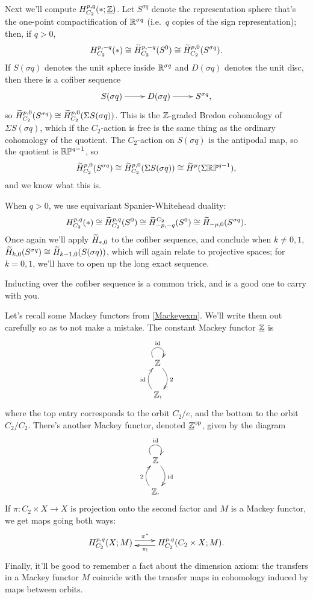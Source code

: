 Next we'll compute $H_{C_2}^{p,q}(*;\underline{\mathbb Z})$. Let $S^{\sigma q}$ denote the representation sphere that's the
one-point compactification of $\mathbb R^{\sigma q}$ (i.e.\ $q$ copies of the sign representation); then, if $q >
0$,
\[H_{C_2}^{p,-q}(*)\cong \widetilde H_{C_2}^{p,-q}(S^0)\cong \widetilde H_{C_2}^{p,0}(S^{\sigma q}).\]
If $S(\sigma q)$ denotes the unit sphere inside $\mathbb R^{\sigma q}$ and $D(\sigma q)$ denotes the unit disc, then there
is a cofiber sequence
\begin{equation}
\label{signed_cofiber}
\xymatrix{
	S(\sigma q)\ar[r] & D(\sigma q)\ar[r] & S^{\sigma q},
}
\end{equation}
so $\widetilde H_{C_2}^{p,0}(S^{\sigma q})\cong\widetilde H_{C_2}^{p,0}(\Sigma S(\sigma q))$. This is the $\mathbb Z$-graded Bredon
cohomology of $\Sigma S(\sigma q)$, which if the $C_2$-action is free is the same thing as the ordinary cohomology
of the quotient. The $C_2$-action on $S(\sigma q)$ is the antipodal map, so the quotient is $\mathbb{RP}^{q-1}$, so
\[\widetilde H_{C_2}^{p,0}(S^{\sigma q})\cong \widetilde H_{C_2}^{p,0}(\Sigma S(\sigma q))\cong \widetilde H^p(\Sigma\mathbb{RP}^{q-1}),\]
and we know what this is.

When $q > 0$, we use equivariant Spanier-Whitehead duality:
\[H_{C_2}^{p,q}(*)\cong \widetilde H_{C_2}^{p,q}(S^0)\cong \widetilde H_{-p,-q}^{C_2}(S^0)\cong \widetilde H_{-p,0}(S^{\sigma q}).\]
Once again we'll apply $\widetilde H_{*,0}$ to the cofiber sequence, and conclude when $k\ne 0,1$, $\widetilde H_{k,0}(S^{\sigma
q})\cong \widetilde H_{k-1,0}(S(\sigma q))$, which will again relate to projective spaces; for $k = 0,1$, we'll have to open
up the long exact sequence.

Inducting over the cofiber sequence is a common trick, and is a good one to carry with you.

Let's recall some Mackey functors from \cref{Mackeyexm}. We'll write them out carefully so as to not make a
mistake. The constant Mackey functor $\underline{\mathbb Z}$ is
\[\xymatrix{
	\Z\ar@/^0.4cm/[d]^2\ar@(ul,ur)^\id\\
	\Z,\ar@/^0.4cm/[u]^\id
}\]
where the top entry corresponds to the orbit $C_2/e$, and the bottom to the orbit $C_2/C_2$. There's another Mackey
functor, denoted $\underline{\mathbb Z}^{\mathrm{op}}$, given by the diagram
\[\xymatrix{
	\Z\ar@/^0.4cm/[d]^\id\ar@(ul,ur)^\id\\
	\Z.\ar@/^0.4cm/[u]^2
}\]
If $\pi\colon C_2\times X\to X$ is projection onto the second factor and $M$ is a Mackey functor, we get maps going
both ways:
\[\xymatrix{
	H_{C_2}^{p,q}(X;M)\ar@<0.1cm>[r]^-{\pi^*} & H_{C_2}^{p,q}(C_2\times X; M).\ar@<0.1cm>[l]^-{\pi_!}
}\]
Finally, it'll be good to remember a fact about the dimension axiom: the transfers in a Mackey functor $M$ coincide
with the transfer maps in cohomology induced by maps between orbits.

